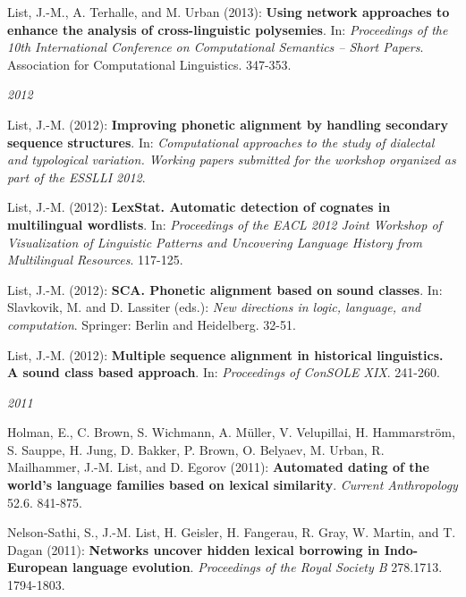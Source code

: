\par
\nopagebreak\noindent List, J.-M., A. Terhalle, and M. Urban (2013): \textbf{Using network approaches to enhance the analysis of cross-linguistic polysemies}. In: \textit{Proceedings of the 10th International Conference on Computational Semantics -- Short Papers}. Association for Computational Linguistics. 347-353.\vspace{0.25cm}
\par
\noindent\textit{2012}\par\nopagebreak\vspace{0.25cm}
\nopagebreak\noindent List, J.-M. (2012): \textbf{Improving phonetic alignment by handling secondary sequence structures}. In: \textit{Computational approaches to the study of dialectal and typological variation. Working papers submitted for the workshop organized as part of the ESSLLI 2012}. \vspace{0.25cm}
\par
\nopagebreak\noindent List, J.-M. (2012): \textbf{LexStat. Automatic detection of cognates in multilingual wordlists}. In: \textit{Proceedings of the EACL 2012 Joint Workshop of Visualization of Linguistic Patterns and Uncovering Language History from Multilingual Resources}. 117-125.\vspace{0.25cm}
\par
\nopagebreak\noindent List, J.-M. (2012): \textbf{SCA. Phonetic alignment based on sound classes}. In: Slavkovik, M. and D. Lassiter (eds.): \textit{New directions in logic, language, and computation}. Springer: Berlin and Heidelberg. 32-51.\vspace{0.25cm}
\par
\nopagebreak\noindent List, J.-M. (2012): \textbf{Multiple sequence alignment in historical linguistics}\textbf{. A sound class based approach}. In: \textit{Proceedings of ConSOLE XIX}. 241-260.\vspace{0.25cm}
\par
\noindent\textit{2011}\par\nopagebreak\vspace{0.25cm}
\nopagebreak\noindent Holman, E., C. Brown, S. Wichmann, A. M\"uller, V. Velupillai, H. Hammarstr\"om, S. Sauppe, H. Jung, D. Bakker, P. Brown, O. Belyaev, M. Urban, R. Mailhammer, J.-M. List, and D. Egorov (2011): \textbf{Automated dating of the world's language families based on lexical similarity}. \textit{Current Anthropology} 52.6. 841-875.\vspace{0.25cm}
\par
\nopagebreak\noindent Nelson-Sathi, S., J.-M. List, H. Geisler, H. Fangerau, R. Gray, W. Martin, and T. Dagan (2011): \textbf{Networks uncover hidden lexical borrowing in Indo-European language evolution}. \textit{Proceedings of the Royal Society B} 278.1713. 1794-1803.\vspace{0.25cm}
